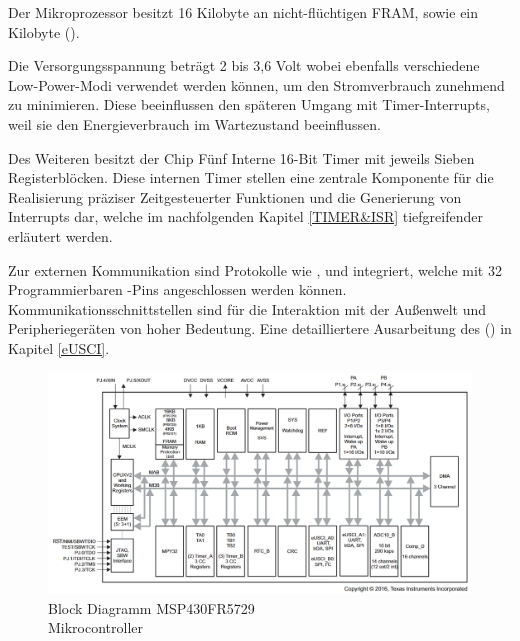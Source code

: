 Der Mikroprozessor besitzt 16 Kilobyte an nicht-fl\"uchtigen FRAM, sowie ein Kilobyte  (). 

Die Versorgungsspannung betr\"agt 2 bis 3,6 Volt wobei ebenfalls verschiedene Low-Power-Modi verwendet werden k\"onnen, um den Stromverbrauch zunehmend zu minimieren. Diese beeinflussen den sp\"ateren Umgang mit Timer-Interrupts, weil sie den Energieverbrauch im Wartezustand beeinflussen. 

Des Weiteren besitzt der Chip F\"unf Interne 16-Bit Timer mit jeweils Sieben\\ Registerbl\"ocken. Diese internen Timer stellen eine zentrale Komponente f\"ur die Realisierung pr\"aziser Zeitgesteuerter Funktionen und die Generierung von Interrupts dar, welche im nachfolgenden Kapitel \ref{TIMER&ISR} tiefgreifender erl\"autert werden.

Zur externen Kommunikation sind Protokolle wie ,  und  integriert, welche mit 32 Programmierbaren -Pins angeschlossen werden k\"onnen. Kommunikationsschnittstellen sind f\"ur die Interaktion mit der Au{\ss}enwelt und Peripherieger\"aten von hoher Bedeutung. Eine detailliertere Ausarbeitung des  () in Kapitel \ref{eUSCI}. 

\begin{figure}[h!]
	\centering
	\includegraphics[width=1.0\textwidth]{../Bilder/FunctionalBlockDiagram_MSP430FR5729.png}
	\caption{Block Diagramm MSP430FR5729\\Mikrocontroller {}}
	\label{fig:BlockDiagramm_msp430}
\end{figure}

